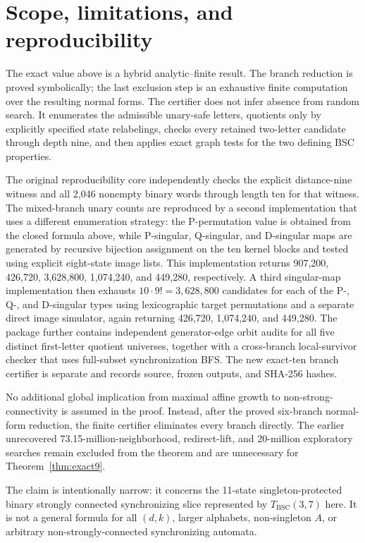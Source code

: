 \documentclass[11pt]{article}
\theoremstyle{definition}
\theoremstyle{remark}
\newcommand{\BSC}{\mathrm{BSC}}
\begin{document}
\section{Scope, limitations, and reproducibility}
The exact value above is a hybrid analytic--finite result. The branch reduction is proved symbolically; the last exclusion step is an exhaustive finite computation over the resulting normal forms. The certifier does not infer absence from random search. It enumerates the admissible unary-safe letters, quotients only by explicitly specified state relabelings, checks every retained two-letter candidate through depth nine, and then applies exact graph tests for the two defining BSC properties.

The original reproducibility core independently checks the explicit distance-nine witness and all 2,046 nonempty binary words through length ten for that witness. The mixed-branch unary counts are reproduced by a second implementation that uses a different enumeration strategy: the P-permutation value is obtained from the closed formula above, while P-singular, Q-singular, and D-singular maps are generated by recursive bijection assignment on the ten kernel blocks and tested using explicit eight-state image lists. This implementation returns 907,200, 426,720, 3,628,800, 1,074,240, and 449,280, respectively. A third singular-map implementation then exhausts $10\cdot9!=3,628,800$ candidates for each of the P-, Q-, and D-singular types using lexicographic target permutations and a separate direct image simulator, again returning 426,720, 1,074,240, and 449,280. The package further contains independent generator-edge orbit audits for all five distinct first-letter quotient universes, together with a cross-branch local-survivor checker that uses full-subset synchronization BFS. The new exact-ten branch certifier is separate and records source, frozen outputs, and SHA-256 hashes.

No additional global implication from maximal affine growth to non-strong-connectivity is assumed in the proof. Instead, after the proved six-branch normal-form reduction, the finite certifier eliminates every branch directly. The earlier unrecovered 73.15-million-neighborhood, redirect-lift, and 20-million exploratory searches remain excluded from the theorem and are unnecessary for Theorem~\ref{thm:exact9}.

The claim is intentionally narrow: it concerns the 11-state singleton-protected binary strongly connected synchronizing slice represented by $T_{\BSC}(3,7)$ here. It is not a general formula for all $(d,k)$, larger alphabets, non-singleton $A$, or arbitrary non-strongly-connected synchronizing automata.
\end{document}
